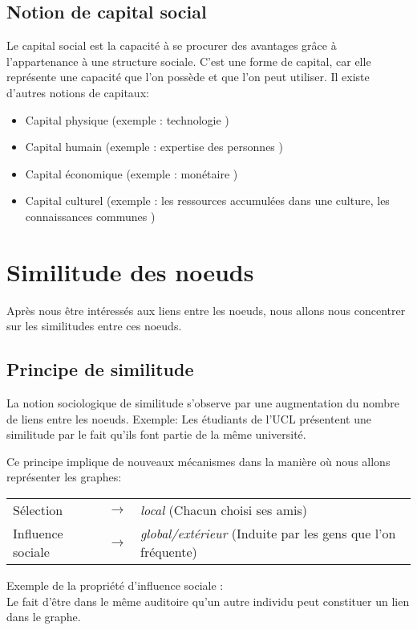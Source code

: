 \subsection{Notion de capital social}
Le capital social est la capacité à se procurer des avantages grâce à l'appartenance à une structure sociale. C'est une forme de capital, car elle représente une capacité que l'on possède et que l'on peut utiliser.  
Il existe d'autres notions de capitaux:\\

\begin{itemize}
\item Capital physique (exemple : technologie ) 
\item Capital humain (exemple : expertise des personnes )
\item Capital économique (exemple : monétaire ) 
\item Capital culturel (exemple : les ressources accumulées dans une culture, les connaissances communes )
\end{itemize}

\section{Similitude des noeuds}
Après nous être intéressés aux liens entre les noeuds, nous allons nous concentrer sur les similitudes entre  ces noeuds. 

\subsection{Principe de similitude}
La notion sociologique de similitude s'observe par une augmentation du nombre de liens entre les noeuds. 
Exemple: Les étudiants de l'UCL présentent une similitude par le fait qu'ils font partie de la même université. 

Ce principe implique de nouveaux mécanismes dans la manière où nous allons représenter les graphes:

\begin{tabular}{lcp{7cm}}
Sélection & $\longrightarrow$ & \textit{local} (Chacun choisi ses amis) \\
Influence sociale & $\longrightarrow$ & \textit{global/extérieur} (Induite par les gens que l'on fréquente)
\end{tabular}

Exemple de la propriété d'influence sociale :\\ Le fait d'être dans le même auditoire qu'un autre individu peut constituer un lien dans le graphe.


